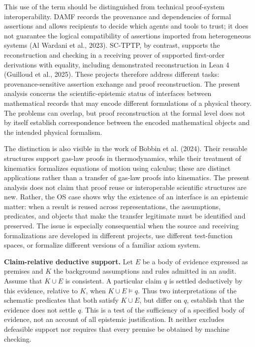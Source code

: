 \documentclass[pdflatex,sn-apa]{sn-jnl}
\begin{document}
This use of the term should be distinguished from technical proof-system interoperability. DAMF records the provenance and dependencies of formal assertions and allows recipients to decide which agents and tools to trust; it does not guarantee the logical compatibility of assertions imported from heterogeneous systems (Al Wardani et al., 2023). SC-TPTP, by contrast, supports the reconstruction and checking in a receiving prover of supported first-order derivations with equality, including demonstrated reconstruction in Lean 4 (Guilloud et al., 2025). These projects therefore address different tasks: provenance-sensitive assertion exchange and proof reconstruction. The present analysis concerns the scientific-epistemic status of interfaces between mathematical records that may encode different formulations of a physical theory. The problems can overlap, but proof reconstruction at the formal level does not by itself establish correspondence between the encoded mathematical objects and the intended physical formalism.

The distinction is also visible in the work of Bobbin et al. (2024). Their reusable structures support gas-law proofs in thermodynamics, while their treatment of kinematics formalizes equations of motion using calculus; these are distinct applications rather than a transfer of gas-law proofs into kinematics. The present analysis does not claim that proof reuse or interoperable scientific structures are new. Rather, the OS case shows why the existence of an interface is an epistemic matter: when a result is reused across representations, the assumptions, predicates, and objects that make the transfer legitimate must be identified and preserved. The issue is especially consequential when the source and receiving formalizations are developed in different projects, use different test-function spaces, or formalize different versions of a familiar axiom system.

\noindent\textbf{Claim-relative deductive support.}
Let \(E\) be a body of evidence expressed as premises and \(K\) the background assumptions and rules admitted in an audit. Assume that \(K\cup E\) is consistent. A particular claim \(q\) is settled deductively by this evidence, relative to \(K\), when \(K\cup E\models q\). Thus two interpretations of the schematic predicates that both satisfy \(K\cup E\), but differ on \(q\), establish that the evidence does not settle \(q\). This is a test of the sufficiency of a specified body of evidence, not an account of all epistemic justification. It neither excludes defeasible support nor requires that every premise be obtained by machine checking.
\end{document}
